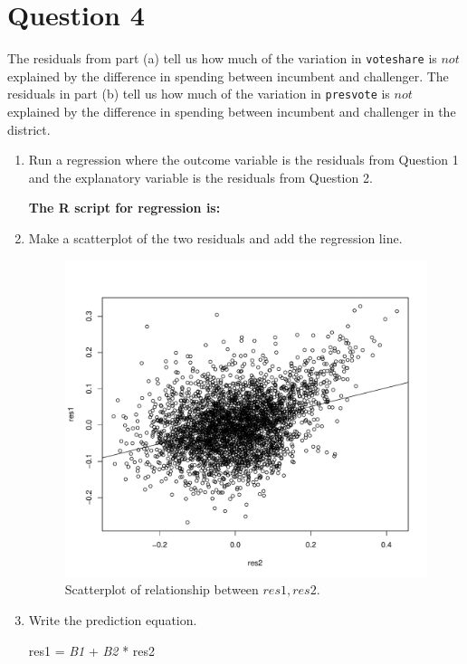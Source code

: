 \documentclass[12pt,letterpaper]{article}
\begin{document}
\newpage	
\section*{Question 4}
\noindent The residuals from part (a) tell us how much of the variation in \texttt{voteshare} is $not$ explained by the difference in spending between incumbent and challenger. The residuals in part (b) tell us how much of the variation in \texttt{presvote} is $not$ explained by the difference in spending between incumbent and challenger in the district.
	\begin{enumerate}
		\item Run a regression where the outcome variable is the residuals from Question 1 and the explanatory variable is the residuals from Question 2.
		
		\textbf{		The R script for regression is:}
		 
		
		
		\item Make a scatterplot of the two residuals and add the regression line. 
		
		
		  
		
		
		\begin{figure}[h!]\centering	\caption{\footnotesize Scatterplot of relationship between $res1, res2$.}	
			
			\includegraphics[width=.7\textwidth]{plot4.pdf}
			
		\end{figure}
		
		
		\item Write the prediction equation.
	
	
	res1 = \textit{B1} + \textit{B2} * res2
	
	
	\end{enumerate}
	
\end{document}
